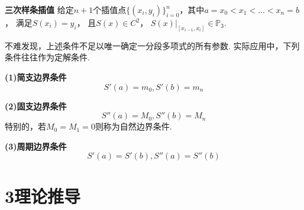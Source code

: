 \documentclass[12pt]{article}
\begin{document}
\textbf{三次样条插值} 
给定$n+1$个插值点$\{(x_{i},y_{i})\}_{i=0}^n$，其中$a=x_{0}<x_{1}<...<x_{n}=b$，
满足$S(x_{i})=y_{i}$，
且$S(x)\in C^{2}$，
$S(x)\big|_{[x_{i-1},x_{i}]}\in\mathbb{P}_{3}$.

\par 不难发现，上述条件不足以唯一确定一分段多项式的所有参数. 实际应用中，下列条件往往作为定解条件.

\textbf{(1)简支边界条件}
	\begin{equation}\label{1}
	S'(a)=m_{0}, S'(b)=m_{n}
	\end{equation}
	
\textbf{(2)固支边界条件}
	\begin{equation}\label{2}
	S''(a)=M_{0}, S''(b)=M_{n}
	\end{equation}
	特别的，若$M_{0}=M_{1}=0$则称为自然边界条件.
	
\textbf{(3)周期边界条件}
	\begin{equation}\label{3}
	S'(a)=S'(b), S''(a)=S''(b)
	\end{equation}

\section*{{\large\bf 3}\quad\large\heiti  理论推导}
\end{document}
